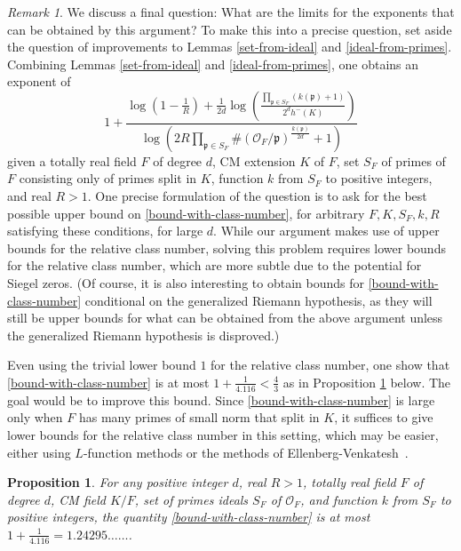 \documentclass[12pt]{amsart}
\newtheorem{prop}[theo]{Proposition}
\theoremstyle{remark}
\newtheorem{remark}[theo]{Remark}
\theoremstyle{definition}
\begin{document}
\begin{remark} We discuss a final question: What are the limits for the exponents that can be obtained by this argument? To make this into a precise question, set aside the question of improvements to Lemmas \ref{set-from-ideal} and \ref{ideal-from-primes}. Combining Lemmas \ref{set-from-ideal} and \ref{ideal-from-primes}, one obtains an exponent of
\begin{equation}\label{bound-with-class-number} 1+ \frac{ \log \left(1-\frac{1}{R}\right) +  \frac{1}{2d} \log \left( \frac{ \prod_{\mathfrak p \in S_F} (k(\mathfrak p)+1  )}{ 2^d h^{-}(K)} \right) }{\log \left( 2R\prod_{\mathfrak p\in S_F} \# (\mathcal O_F/\mathfrak p)^{\frac{k(\mathfrak p)}{2d}} +1 \right)}   \end{equation}
given a totally real field $F$ of degree $d$, CM extension $K$ of $F$, set $S_F$ of primes of $F$ consisting only of primes split in $K$, function $k$ from $S_F$ to positive integers, and real $R>1$. One precise formulation of the question is to ask for the best possible upper bound on \eqref{bound-with-class-number}, for arbitrary $F,K, S_F, k, R$ satisfying these conditions, for large $d$. While our argument makes use of upper bounds for the relative class number, solving this problem requires lower bounds for the relative class number, which are more subtle due to the potential for Siegel zeros. (Of course, it is also interesting to obtain bounds for \eqref{bound-with-class-number} conditional on the generalized Riemann hypothesis, as they will still be upper bounds for what can be obtained from the above argument unless the generalized Riemann hypothesis is disproved.)

Even using the trivial lower bound $1$ for the relative class number, one show that \eqref{bound-with-class-number} is at most $1+ \frac{1}{4.116}<\frac{4}{3}$ as in Proposition \ref{upper-bound} below. The goal would be to improve this bound. Since \eqref{bound-with-class-number} is large only when $F$ has many primes of small norm that split in $K$, it suffices to give lower bounds for the relative class number in this setting, which may be easier, either using $L$-function methods or the methods of Ellenberg-Venkatesh~\cite{Ellenberg2007}. \end{remark}
 
 \begin{prop}\label{upper-bound} For any positive integer $d$, real $R>1$, totally real field $F$ of degree $d$, CM field $K/F$, set of primes ideals $S_F$ of $\mathcal O_F$, and function $k$ from $S_F$ to positive integers, the quantity \eqref{bound-with-class-number} is at most $1+\frac{1}{4.116} = 1.24295 \dots \dots$.\end{prop} 
 
\end{document}
